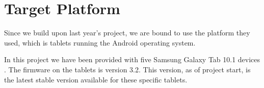 \section{Target Platform}
Since we build upon last year's project, we are bound to use the platform they used, which is tablets running the Android operating system.

In this project we have been provided with five Samsung Galaxy Tab 10.1 devices \citep{tablet}. The firmware on the tablets is version 3.2. 
This version, as of project start, is the latest stable version available for these specific tablets. \citep{tablet}